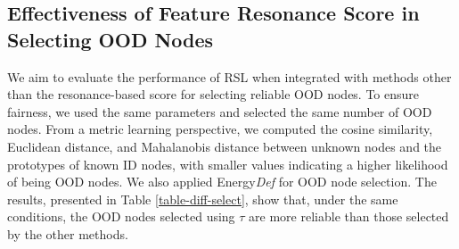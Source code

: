 

\subsection{Effectiveness of Feature Resonance Score in Selecting OOD Nodes}
We aim to evaluate the performance of RSL when integrated with methods other than the resonance-based score for selecting reliable OOD nodes. To ensure fairness, we used the same parameters and selected the same number of OOD nodes. From a metric learning perspective, we computed the cosine similarity, Euclidean distance, and Mahalanobis distance between unknown nodes and the prototypes of known ID nodes, with smaller values indicating a higher likelihood of being OOD nodes. We also applied Energy\textit{Def} for OOD node selection. The results, presented in Table \ref{table-diff-select}, show that, under the same conditions, the OOD nodes selected using $\tau$ are more reliable than those selected by the other methods.

